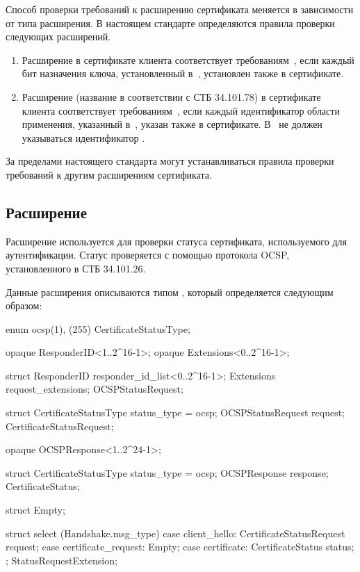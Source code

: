 Способ проверки требований к расширению сертификата меняется в зависимости от 
типа расширения. В настоящем стандарте определяются правила проверки следующих 
расширений.

\begin{enumerate}
\item
Расширение  в сертификате клиента соответствует 
требованиям~, если каждый бит назначения ключа, установленный 
в~, установлен также в сертификате.
\item
Расширение  (название в соответствии с СТБ 34.101.78) в 
сертификате клиента соответствует требованиям~, если каждый 
идентификатор области применения, указанный в~, указан также 
в сертификате.
%
В~ не должен указываться идентификатор 
.
\end{enumerate}

За пределами настоящего стандарта могут устанавливаться 
правила проверки требований к другим расширениям сертификата. 

\subsection{Расширение }\label{HS.Ext.sr} 

Расширение  используется для проверки статуса сертификата, 
используемого для аутентификации. Статус проверяется с помощью протокола 
OCSP, установленного в СТБ 34.101.26.

Данные расширения  описываются типом 
, который определяется следующим образом: 

\begin{codeblock}
enum { ocsp(1), (255) } CertificateStatusType;

opaque ResponderID<1..2^16-1>;
opaque Extensions<0..2^16-1>;

struct {
  ResponderID responder_id_list<0..2^16-1>;
  Extensions request_extensions;
} OCSPStatusRequest;

struct {
  CertificateStatusType status_type = ocsp;
  OCSPStatusRequest request;
} CertificateStatusRequest;

opaque OCSPResponse<1..2^24-1>;

struct {
  CertificateStatusType status_type = ocsp;
  OCSPResponse response;
} CertificateStatus;

struct {} Empty;

struct {
  select (Handshake.msg_type) {
    case client_hello:
      CertificateStatusRequest request;
    case certificate_request: Empty;
    case certificate:
      CertificateStatus status;
  };
} StatusRequestExtension;
\end{codeblock}

